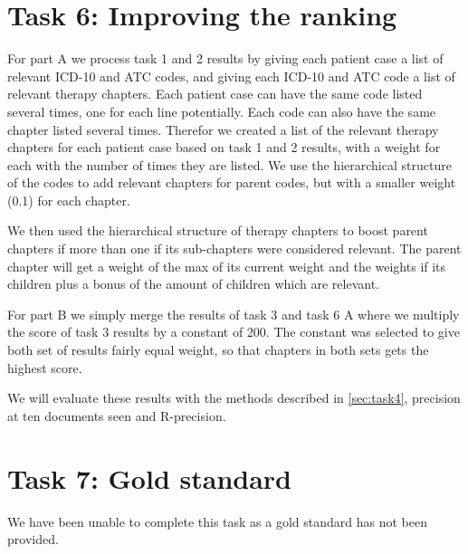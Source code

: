 \section{Task 6: Improving the ranking}
For part A we process task 1 and 2 results by giving each patient case a list
of relevant ICD-10 and ATC codes, and giving each ICD-10 and ATC code a list
of relevant therapy chapters. Each patient case can have the same code listed
several times, one for each line potentially. Each code can also have the same
chapter listed several times. Therefor we created a list of the relevant
therapy chapters for each patient case based on task 1 and 2 results, with a
weight for each with the number of times they are listed. We use the
hierarchical structure of the codes to add relevant chapters for parent codes,
but with a smaller weight (0.1) for each chapter.

We then used the hierarchical structure of therapy chapters to boost parent
chapters if more than one if its sub-chapters were considered relevant. The
parent chapter will get a weight of the max of its current weight and the
weights if its children plus a bonus of the amount of children which are
relevant.

For part B we simply merge the results of task 3 and task 6 A where we
multiply the score of task 3 results by a constant of 200. The constant was
selected to give both set of results fairly equal weight, so that chapters
in both sets gets the highest score.

We will evaluate these results with the methods described in
\autoref{sec:task4}, precision at ten documents seen and R-precision.


\section{Task 7: Gold standard}
We have been unable to complete this task as a gold standard has not been
provided.


